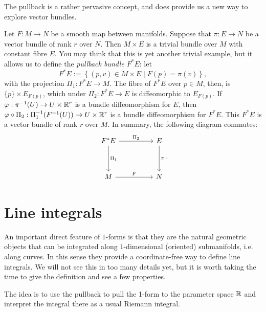The pullback is a rather pervasive concept, and does provide us a new way to explore vector bundles.

\begin{example}
  Let $F:M\to N$ be a smooth map between manifolds. Suppose that $\pi: E \to N$ be a vector bundle of rank $r$ over $N$.
  Then $M\times E$ is a trivial bundle over $M$ with constant fibre $E$.
  You may think that this is yet another trivial example, but it allows us to define the \emph{pullback bundle $F^* E$}: let
  \begin{equation}
    F^* E := \left\lbrace (p, v) \in M\times E \mid F(p) = \pi(v)\right\rbrace,
  \end{equation}
  with the projection $\Pi_1:F^* E \to M$.
  The fibre of $F^*E$ over $p\in M$, then, is $\{p\}\times E_{F(p)}$, which under $\Pi_2:F^* E \to E$ is diffeomorphic to $E_{F(p)}$.
  If $\varphi : \pi^{-1}(U) \to U\times\mathbb{R}^r$ is a bundle diffeomorphism for $E$, then $\varphi\circ\Pi_2: \Pi_1^{-1}(F^{-1}(U)) \to U\times\mathbb{R}^r$ is a bundle diffeomorphism for $F^*E$.
  This $F^*E$ is a vector bundle of rank $r$ over $M$.
  In summary, the following diagram commutes:
  \begin{equation}
    \begin{tikzcd}[row sep=huge, column sep=huge]
      F^* E \arrow[r, "\Pi_2"] \arrow[d, "\Pi_1"]
      & E \arrow[d, "\pi"] \\
      M \arrow[r, "F"]
      & N
    \end{tikzcd}.
  \end{equation}
\end{example}

\section{Line integrals}

An important direct feature of $1$-forms is that they are the natural geometric objects that can be integrated along $1$-dimensional (oriented) submanifolds, i.e. along curves.
In this sense they provide a coordinate-free way to define line integrals.
We will not see this in too many details yet, but it is worth taking the time to give the definition and see a few properties.

The idea is to use the pullback to pull the 1-form to the parameter space $\mathbb{R}$ and interpret the integral there as a usual Riemann integral.


